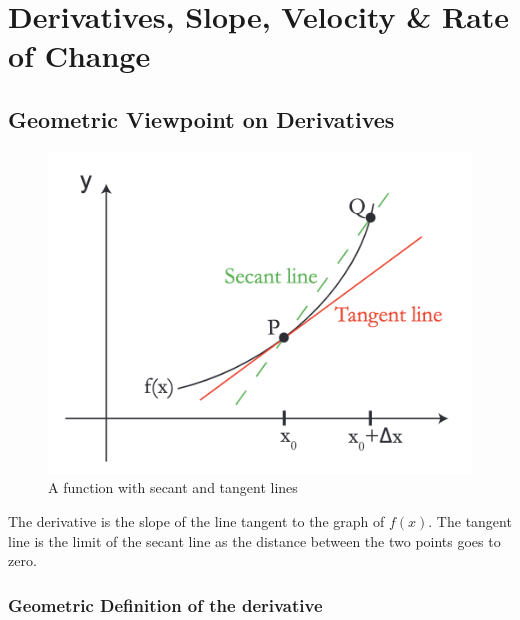 

\chapter{Derivatives, Slope, Velocity \& Rate of Change}

\bigbreak
\section{Geometric Viewpoint on Derivatives}

\begin{figure}[ht!]
	\centering
	\includegraphics[scale=0.3]{./images/lecture_1_figure_1.png}
	\caption{A function with secant and tangent lines}
\end{figure}

The derivative is the slope of the line tangent to the graph of $f(x)$.
The tangent line is the limit of the secant line as the distance between the two points goes to zero.

\subsection{Geometric Definition of the derivative}


